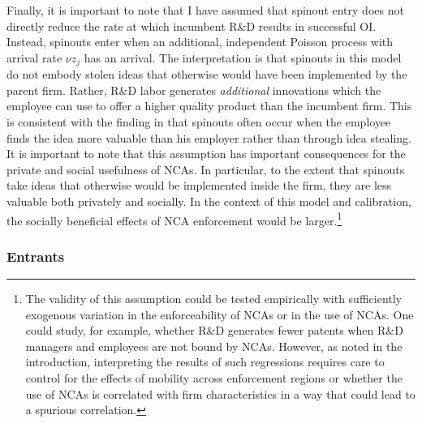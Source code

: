 \documentclass[ecta,nameyear,final]{econsocart}
\theoremstyle{plain}
\theoremstyle{remark}
\begin{document}
Finally, it is important to note that I have assumed that spinout entry does not directly reduce the rate at which incumbent R\&D results in successful OI. Instead, spinouts enter when an additional, independent Poisson process with arrival rate $\nu z_j$ has an arrival. The interpretation is that spinouts in this model do not embody stolen ideas that otherwise would have been implemented by the parent firm. Rather, R\&D labor generates \textit{additional} innovations which the employee can use to offer a higher quality product than the incumbent firm. This is consistent with the finding in \cite{klepper_disagreements_2007} that spinouts often occur when the employee finds the idea more valuable than his employer rather than through idea stealing. It is important to note that this assumption has important consequences for the private and social usefulness of NCAs. In particular, to the extent that spinouts take ideas that otherwise would be implemented inside the firm, they are less valuable both privately and socially. In the context of this model and calibration, the socially beneficial effects of NCA enforcement would be larger.\footnote{The validity of this assumption could be tested empirically with sufficiently exogenous variation in the enforceability of NCAs or in the use of NCAs. One could study, for example, whether R\&D generates fewer patents when R\&D managers and employees are not bound by NCAs. However, as noted in the introduction, interpreting the results of such regressions requires care to control for the effects of mobility across enforcement regions or whether the use of NCAs is correlated with firm characteristics in a way that could lead to a spurious correlation.}

\subsubsection{Entrants} \label{subsubsec:entrants}
\end{document}
